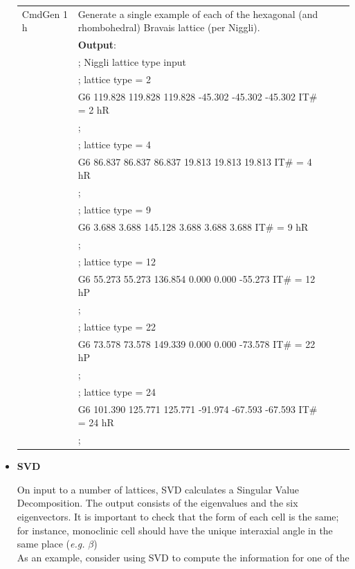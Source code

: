 \documentclass[preprint]{iucr}              %
\numberwithin{equation}{section}
\begin{document}
\begin{itemize}
\begin{table}
\begin{tabular}{l l l l}
			CmdGen 1 h& Generate a single example of each of the hexagonal (and rhombohedral) Bravais lattice (per Niggli).\\
			{}&\textbf{Output}:\\
			{}&; Niggli lattice type input\\
			{}&; lattice type = 2\\
			{}&G6   119.828   119.828   119.828   -45.302   -45.302   -45.302   IT\# = 2  hR\\
			{}&;\\
			{}&; lattice type = 4\\
			{}&G6    86.837    86.837    86.837    19.813    19.813    19.813   IT\# = 4  hR\\
			{}&;\\
			{}&; lattice type = 9\\
			{}&G6     3.688     3.688   145.128     3.688     3.688     3.688   IT\# = 9  hR\\
			{}&;\\
			{}&; lattice type = 12\\
			{}&G6    55.273    55.273   136.854     0.000     0.000   -55.273   IT\# = 12  hP\\
			{}&;\\
			{}&; lattice type = 22\\
			{}&G6    73.578    73.578   149.339     0.000     0.000   -73.578   IT\# = 22  hP\\
			{}&;\\
			{}&; lattice type = 24\\
			{}&G6   101.390   125.771   125.771   -91.974   -67.593   -67.593   IT\# = 24  hR\\
			{}&;\\
			\bottomrule
		\end{tabular}	
	\end{table}	
	
	
	\item \textbf{SVD}
	
	On input to a number of lattices, 
	SVD calculates a Singular Value Decomposition.
	The output consists of the eigenvalues and 
	the six eigenvectors.
	It is important to check that the form of
	each cell is the same; for instance, monoclinic
	cell should have the unique interaxial angle
	in the same place (\textit{e.g.} $\beta$)\\
	
	As an example, consider using SVD to compute the information
	for one of the 
	

\end{itemize}
\end{document}
